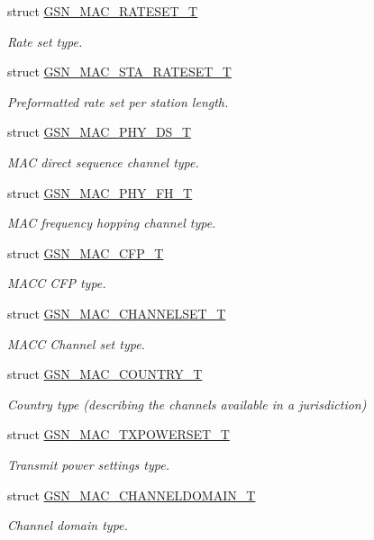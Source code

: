 \begin{DoxyCompactItemize}
struct \hyperlink{a00125}{GSN\_\-MAC\_\-RATESET\_\-T}
\begin{DoxyCompactList}\small\item\em Rate set type. \end{DoxyCompactList}\item 
struct \hyperlink{a00132}{GSN\_\-MAC\_\-STA\_\-RATESET\_\-T}
\begin{DoxyCompactList}\small\item\em Preformatted rate set per station length. \end{DoxyCompactList}\item 
struct \hyperlink{a00119}{GSN\_\-MAC\_\-PHY\_\-DS\_\-T}
\begin{DoxyCompactList}\small\item\em MAC direct sequence channel type. \end{DoxyCompactList}\item 
struct \hyperlink{a00120}{GSN\_\-MAC\_\-PHY\_\-FH\_\-T}
\begin{DoxyCompactList}\small\item\em MAC frequency hopping channel type. \end{DoxyCompactList}\item 
struct \hyperlink{a00112}{GSN\_\-MAC\_\-CFP\_\-T}
\begin{DoxyCompactList}\small\item\em MACC CFP type. \end{DoxyCompactList}\item 
struct \hyperlink{a00114}{GSN\_\-MAC\_\-CHANNELSET\_\-T}
\begin{DoxyCompactList}\small\item\em MACC Channel set type. \end{DoxyCompactList}\item 
struct \hyperlink{a00115}{GSN\_\-MAC\_\-COUNTRY\_\-T}
\begin{DoxyCompactList}\small\item\em Country type (describing the channels available in a jurisdiction) \end{DoxyCompactList}\item 
struct \hyperlink{a00135}{GSN\_\-MAC\_\-TXPOWERSET\_\-T}
\begin{DoxyCompactList}\small\item\em Transmit power settings type. \end{DoxyCompactList}\item 
struct \hyperlink{a00113}{GSN\_\-MAC\_\-CHANNELDOMAIN\_\-T}
\begin{DoxyCompactList}\small\item\em Channel domain type. \end{DoxyCompactList}\item 

\end{DoxyCompactItemize}
